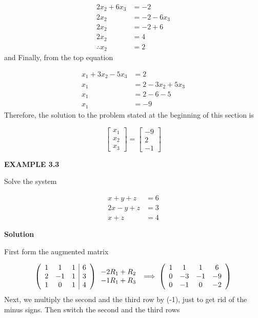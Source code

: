 \documentclass[a4paper, 12pt]{report}
\begin{document}
{     \begin{align*}
     2x_2+6x_3&=-2\\
     2x_2&=-2-6x_3\\
     2x_2&=-2+6\\
     2x_2&=4\\
     \therefore x_2&=2
     \end{align*}
     and Finally, from the top equation
     
     \begin{align*}
     x_1+3x_2-5x_3&=2\\
     x_1&=2-3x_2+5x_3\\
     x_1&=2-6-5\\
     x_1&=-9
     \end{align*}
     Therefore, the solution to the problem stated at the beginning of this section is
     
     \begin{equation*}
     \begin{bmatrix} x_1\\x_2\\x_3 \end{bmatrix}
     =
     \begin{bmatrix} -9\\2\\-1 \end{bmatrix}
     \end{equation*}
     \newpage
     \begin{center}
     	\textbf{EXAMPLE 3.3}
     \end{center}
      Solve the system
     
     \begin{align*}
     x+y+z&=6\\
     2x-y+z&=3\\
     x+z&=4
     \end{align*}
     \begin{center}
     	\textbf{Solution}
     \end{center}
      First form the augmented matrix 
     
     \[
     \left( \begin{array}{c c c |c}
     1& 1& 1& 6\\
     2& -1& 1& 3\\
     1& 0& 1& 4
     \end{array} \right)
     \begin{array}{c} -2R_1+R_2 \\ -1R_1+R_3 \end{array}
     \implies
     \left( \begin{array}{c c c c}
     1& 1& 1& 6\\
     0& -3& -1& -9\\
     0& -1& 0& -2
     \end{array} \right)
     \]
     Next, we multiply the second and the third row by (-1), just to get rid of the minus signs. Then switch the second and the third rows
     
}
\end{document}
